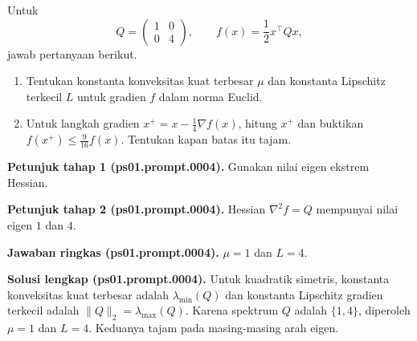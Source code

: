 \begin{exercise}
\label{orig03:ps01:problem:0002}
Untuk
\[
 Q=\begin{pmatrix}1&0\\0&4\end{pmatrix},
 \qquad f(x)=\frac12x^\top Qx,
\]
jawab pertanyaan berikut.
\begin{enumerate}
\item\label{orig03:ps01:prompt:0004}
Tentukan konstanta konveksitas kuat terbesar $\mu$ dan konstanta Lipschitz
terkecil $L$ untuk gradien $f$ dalam norma Euclid.
\item\label{orig03:ps01:prompt:0005}
Untuk langkah gradien $x^+=x-\tfrac14\nabla f(x)$, hitung $x^+$ dan buktikan
$f(x^+)\leq\tfrac9{16}f(x)$. Tentukan kapan batas itu tajam.
\end{enumerate}
\end{exercise}

\par\noindent\textbf{Petunjuk tahap 1 (ps01.prompt.0004).}
Gunakan nilai eigen ekstrem Hessian.
\label{orig03:ps01:hint1:0004}
\par\noindent\textbf{Petunjuk tahap 2 (ps01.prompt.0004).}
Hessian $\nabla^2f=Q$ mempunyai nilai eigen $1$ dan $4$.
\label{orig03:ps01:hint2:0004}
\par\noindent\textbf{Jawaban ringkas (ps01.prompt.0004).}
$\mu=1$ dan $L=4$.
\label{orig03:ps01:answer:0004}
\par\noindent\textbf{Solusi lengkap (ps01.prompt.0004).}
Untuk kuadratik simetris, konstanta konveksitas kuat terbesar adalah
$\lambda_{\min}(Q)$ dan konstanta Lipschitz gradien terkecil adalah
$\lVert Q\rVert_2=\lambda_{\max}(Q)$. Karena spektrum $Q$ adalah $\{1,4\}$,
diperoleh $\mu=1$ dan $L=4$. Keduanya tajam pada masing-masing arah eigen.
\label{orig03:ps01:solution:0004}

